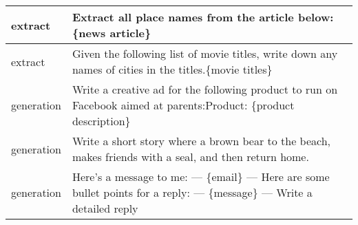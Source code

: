 \begin{longtable}{p{} p{}}
       extract &                                                                                                                                                                                                                                                                                                                                                        Extract all place names from the article below:{\newline} {\newline}{\newline} \{news article\} \\ \midrule
       extract &                                                                                                                                                                                                                                                                                                                    Given the following list of movie titles, write down any names of cities in the titles.{\newline}{\newline}\{movie titles\} \\ \midrule
    generation &                                                                                                                                                                                                                                                                                                         Write a creative ad for the following product to run on Facebook aimed at parents:{\newline}{\newline}Product: \{product description\} \\ \midrule
    generation &                                                                                                                                                                                                                                                                                                                        Write a short story where a brown bear to the beach, makes friends with a seal, and then return home. \\ \midrule
    generation &                                                                                                                                                                                                                                                                          Here's a message to me:{\newline} ---{\newline} \{email\}{\newline} ---{\newline} {\newline}{\newline} Here are some bullet points for a reply:{\newline} ---{\newline} \{message\}{\newline} ---{\newline} {\newline}{\newline} Write a detailed reply \\ \midrule

\end{longtable}
